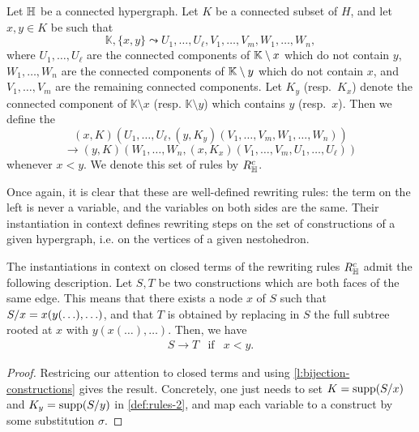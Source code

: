 \begin{definition} \label{def:rules-2}
  Let ${\mathbb H}$ be a connected hypergraph. 
  Let $K$ be a connected subset of $H$, and let $x,y \in K$ be such that
  $$\mathbb{K},\{x,y\} \leadsto U_1,\ldots,U_\ell,V_1,\ldots,V_m,W_1,\ldots,W_n,$$
  where $U_1,\ldots,U_\ell$ are the connected components of ${\mathbb K} \setminus x$ which do not contain $y$, $W_1,\ldots,W_n$ are the connected components of ${\mathbb K} \setminus y$ which do not contain $x$, and $V_1,\ldots,V_m$ are the remaining connected components. 
  Let $K_y$ (resp.\ $K_x$) denote the connected component of $\mathbb{K} \setminus x$ (resp. $\mathbb{K} \setminus y$) which contains $y$ (resp.\ $x$).
  Then we define the 
  $$(x,K)(U_1,\ldots, U_{\ell},(y,K_y)(V_1,\ldots,V_m,W_1,\ldots,W_n))$$
  $$ \longrightarrow (y,K)(W_1,\ldots,W_n,(x,K_x)(V_1,\ldots,V_m,U_1,\ldots,U_\ell))$$
  whenever $x < y$. 
  We denote this set of rules by $R_{\mathbb H}^c$.
\end{definition} 

Once again, it is clear that these are well-defined rewriting rules: the term on the left is never a variable, and the variables on both sides are the same.
Their instantiation in context defines rewriting steps on the set of constructions of a given hypergraph, i.e. on the vertices of a given nestohedron.

\begin{lemma} 
  \label{l:instantiation-constructions}
  The instantiations in context on closed terms of the rewriting rules $R_{\mathbb H}^c$ admit the following description.
  Let $S,T$ be two constructions which are both faces of the same edge. 
  This means that there exists a node $x$ of $S$ such that $S/x=x(y(\ldots),\ldots)$, and that $T$ is obtained by replacing in $S$ the full subtree rooted at $x$ with $y(x(\ldots),\ldots)$. 
  Then, we have
  $$\begin{array}{lll}
    S \to T &  \mathrm{if} & x < y. 
  \end{array}$$
\end{lemma} 

\begin{proof}
  Restricing our attention to closed terms and using \cref{l:bijection-constructions} gives the result. 
  Concretely, one just needs to set $K=\operatorname{supp}(S/x)$ and $K_y=\operatorname{supp}(S/y)$ in \cref{def:rules-2}, and map each variable to a construct by some substitution $\sigma$.
\end{proof}

